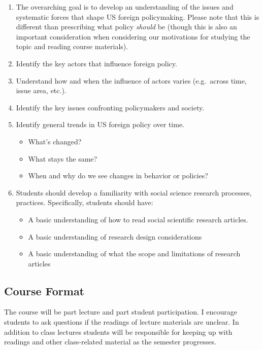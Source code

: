 \documentclass[
  letterpaper,
  DIV=11,
  numbers=noendperiod]{scrartcl}
\providecommand{\tightlist}{%
  \setlength{\itemsep}{0pt}\setlength{\parskip}{0pt}}
\begin{document}
\begin{enumerate}
\def\labelenumi{\arabic{enumi}.}
\tightlist
\item
  The overarching goal is to develop an understanding of the issues and
  systematic forces that shape US foreign policymaking. Please note that
  this is different than prescribing what policy \emph{should} be
  (though this is also an important consideration when considering our
  motivations for studying the topic and reading course materials).
\item
  Identify the key actors that influence foreign policy.
\item
  Understand how and when the influence of actors varies (e.g.~across
  time, issue area, etc.).
\item
  Identify the key issues confronting policymakers and society.
\item
  Identify general trends in US foreign policy over time.

  \begin{itemize}
  \tightlist
  \item
    What's changed?
  \item
    What stays the same?
  \item
    When and why do we see changes in behavior or policies?
  \end{itemize}
\item
  Students should develop a familiarity with social science research
  processes, practices. Specifically, students should have:

  \begin{itemize}
  \tightlist
  \item
    A basic understanding of how to read social scientific research
    articles.
  \item
    A basic understanding of research design considerations
  \item
    A basic understanding of what the scope and limitations of research
    articles
  \end{itemize}
\end{enumerate}

\subsection{Course Format}\label{course-format}

The course will be part lecture and part student participation. I
encourage students to ask questions if the readings of lecture materials
are unclear. In addition to class lectures students will be responsible
for keeping up with readings and other class-related material as the
semester progresses.
\end{document}

